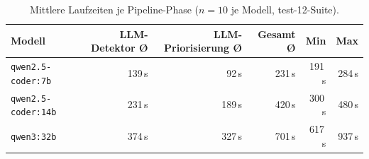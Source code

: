 \begin{table}[htbp]
\centering
\small
\renewcommand{\arraystretch}{1.15}
\begin{tabular}{@{}lrrrrr@{}}
\toprule
\textbf{Modell} & \textbf{\ac{LLM}-Detektor Ø} & \textbf{\ac{LLM}-Priorisierung Ø} & \textbf{Gesamt Ø} & \textbf{Min} & \textbf{Max} \\
\midrule
\texttt{qwen2.5-coder:7b}  & 139\,s & 92\,s  & 231\,s & 191\,s & 284\,s \\
\texttt{qwen2.5-coder:14b} & 231\,s & 189\,s & 420\,s & 300\,s & 480\,s \\
\texttt{qwen3:32b}         & 374\,s & 327\,s & 701\,s & 617\,s & 937\,s \\
\bottomrule
\end{tabular}
\caption[Laufzeiten je Pipeline-Phase (test-12)]{Mittlere Laufzeiten je Pipeline-Phase ($n = 10$ je Modell, test-12-Suite).}
\label{tab:laufzeit_modelle}
\end{table}


\begin{table}[htbp]
\centering
\setlength{\tabcolsep}{4pt}
\renewcommand{\arraystretch}{1.2}
\caption[Effizienzvergleich der Modelle (test-12)]{Effizienzvergleich auf Basis der 30 Benchmark-Runs der test-12-Suite. \textit{\ac{LLM}-Findings/s} bezieht sich auf \ac{LLM}-Detektor-Findings pro Sekunde Gesamtlaufzeit.}
%
\label{tab:effizienz_metriken}
\end{table}

\clearpage

\label{app:overdetection_12}

